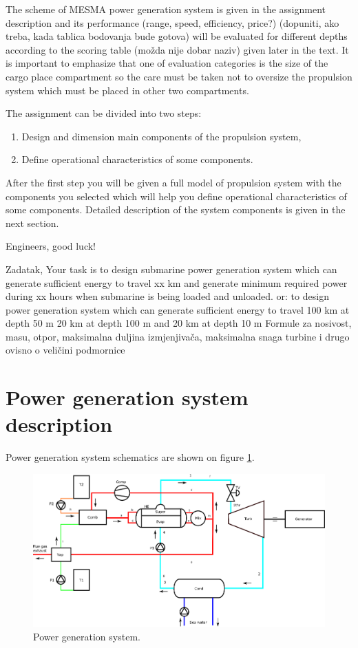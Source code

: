 \documentclass{article}
\begin{document}
	The scheme of MESMA power generation system is given in the assignment description and its performance (range, speed, efficiency, price?) (dopuniti, ako treba, kada tablica bodovanja bude gotova) will be evaluated for different depths according to the scoring table (možda nije dobar naziv) given later in the text. It is important to emphasize that one of evaluation categories is the size of the cargo place compartment so the care must be taken not to oversize the propulsion system which must be placed in other two compartments.
	
	The assignment can be divided into two steps: 
	
	\begin{enumerate}
		\item Design and dimension main components of the propulsion system,
		\item Define operational characteristics of some components.
	\end{enumerate}

	After the first step you will be given a full model of propulsion system with the components you selected which will help you define operational characteristics of some components.
	Detailed description of the system components is given in the next section.
	
	Engineers, good luck!
	
	Zadatak,
	Your task is to design submarine power generation system which can generate sufficient energy to travel xx km and generate minimum required power during xx hours when submarine is being loaded and unloaded.
	or: to design power generation system which can generate sufficient energy to travel 100 km at depth 50 m 20 km at depth  100 m and 20 km at depth 10 m
	Formule za nosivost, masu, otpor, maksimalna duljina izmjenjivača, maksimalna snaga turbine i drugo ovisno o veličini podmornice
		
		
	\section{Power generation system description}
	Power generation system schematics are shown on figure \ref{fig:pwr_scheme}.
	
	\begin{figure}[h!]
		\centering
		\includegraphics[width=\textwidth]{Thermodynamics/pwr_system.png}
		\caption{Power generation system.}
		\label{fig:pwr_scheme}
	\end{figure}
	
\end{document}
